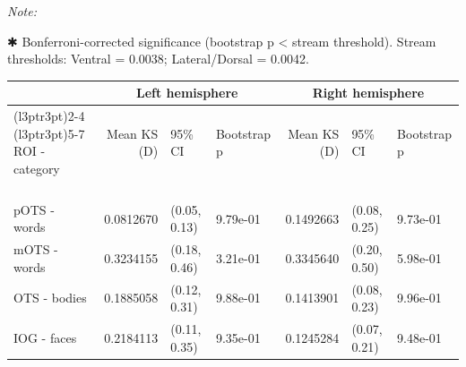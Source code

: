 
\begin{ThreePartTable}
\begin{TableNotes}
\item \textit{Note: } 
\item ✱ Bonferroni-corrected significance (bootstrap p < stream threshold). Stream thresholds: Ventral = 0.0038; Lateral/Dorsal = 0.0042.
\end{TableNotes}
\begin{longtable}{lrllrll}
\toprule
\multicolumn{1}{c}{\textbf{ }} & \multicolumn{3}{c}{\textbf{Left hemisphere}} & \multicolumn{3}{c}{\textbf{Right hemisphere}} \\
\cmidrule(l{3pt}r{3pt}){2-4} \cmidrule(l{3pt}r{3pt}){5-7}
ROI - category & Mean KS (D) & 95\% CI & Bootstrap p & Mean KS (D) & 95\% CI & Bootstrap p\\
\midrule
\addlinespace[0.3em]
\multicolumn{7}{l}{\textbf{X}}\\
\addlinespace[0.3em]
\multicolumn{7}{l}{\textbf{Y}}\\
\addlinespace[0.3em]
\multicolumn{7}{l}{\textbf{eccen}}\\
\addlinespace[0.3em]
\multicolumn{7}{l}{\textbf{size}}\\
\hspace{1em}\hspace{1em}\hspace{1em}\hspace{1em}pOTS - words & 0.0812670 & (0.05, 0.13) & 9.79e-01 & 0.1492663 & (0.08, 0.25) & 9.73e-01\\
\hspace{1em}\hspace{1em}\hspace{1em}\hspace{1em}mOTS - words & 0.3234155 & (0.18, 0.46) & 3.21e-01 & 0.3345640 & (0.20, 0.50) & 5.98e-01\\
\hspace{1em}\hspace{1em}\hspace{1em}\hspace{1em}OTS - bodies & 0.1885058 & (0.12, 0.31) & 9.88e-01 & 0.1413901 & (0.08, 0.23) & 9.96e-01\\
\hspace{1em}\hspace{1em}\hspace{1em}\hspace{1em}IOG - faces & 0.2184113 & (0.11, 0.35) & 9.35e-01 & 0.1245284 & (0.07, 0.21) & 9.48e-01\\

\end{longtable}
\end{ThreePartTable}
